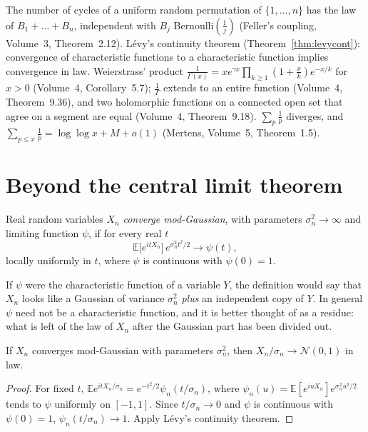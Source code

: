 \begin{reminder}
The number of cycles of a uniform random permutation of $\{1,\dots,n\}$ has the law of $B_1+\dots+B_n$, independent with $B_j$ Bernoulli$(\frac1j)$ (Feller's coupling, Volume~3, Theorem~2.12). L\'evy's continuity theorem (Theorem~\ref{thm:levycont}):
convergence of characteristic functions to a characteristic function implies convergence in law. Weierstrass' product $\frac1{\Gamma(x)}=xe^{\gamma x}\prod_{k\ge1}(1+\frac xk)e^{-x/k}$ for $x>0$ (Volume~4, Corollary~5.7); $\frac1\Gamma$ extends to an entire function
(Volume~4, Theorem~9.36), and two holomorphic functions on a connected open set that agree on a segment are equal (Volume~4, Theorem~9.18). $\sum_p\frac1p$ diverges, and $\sum_{p\le x}\frac1p=\log\log x+M+o(1)$ (Mertens, Volume~5, Theorem~1.5).
\end{reminder}

\section{Beyond the central limit theorem}

\begin{definition}\label{def:modgauss}
Real random variables $X_n$ \emph{converge mod-Gaussian}, with parameters $\sigma_n^2\to\infty$ and limiting function $\psi$, if for every real $t$
\[
\mathbb E\bigl[e^{itX_n}\bigr]\,e^{\sigma_n^2t^2/2}\longrightarrow\psi(t),
\]
locally uniformly in $t$, where $\psi$ is continuous with $\psi(0)=1$.
\end{definition}

If $\psi$ were the characteristic function of a variable $Y$, the definition would say that $X_n$ looks like a Gaussian of variance $\sigma_n^2$ \emph{plus} an independent copy of $Y$. In general $\psi$ need not be a characteristic function, and
it is better thought of as a residue: what is left of the law of $X_n$ after the Gaussian part has been divided out.

\begin{proposition}\label{prop:modgaussclt}
If $X_n$ converges mod-Gaussian with parameters $\sigma_n^2$, then $X_n/\sigma_n\to\mathcal N(0,1)$ in law.
\end{proposition}
\begin{proof}
For fixed $t$, $\mathbb Ee^{itX_n/\sigma_n}=e^{-t^2/2}\psi_n(t/\sigma_n)$, where $\psi_n(u)=\mathbb E[e^{iuX_n}]e^{\sigma_n^2u^2/2}$ tends to $\psi$ uniformly on $[-1,1]$. Since $t/\sigma_n\to0$ and $\psi$ is continuous with $\psi(0)=1$, $\psi_n(t/\sigma_n)\to1$. Apply L\'evy's continuity theorem.
\end{proof}


